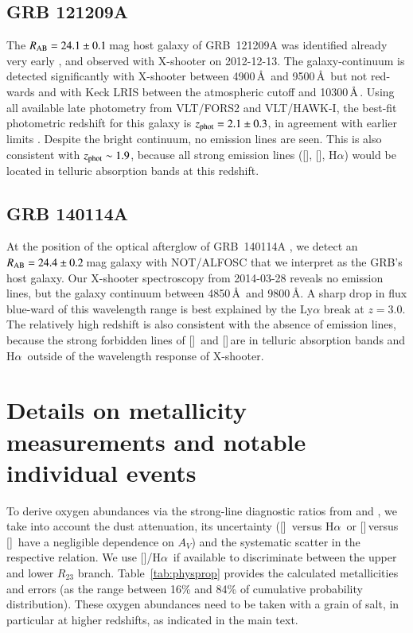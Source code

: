 \documentclass[traditabstract, longauth]{aa}
\newcommand{\ha}{H$\alpha$}
\newcommand{\oii}{[\ion{O}{ii}]}
\newcommand{\oiii}{[\ion{O}{iii}]}
\newcommand{\neiii}{[\ion{Ne}{iii}]}
\newcommand{\nii}{[\ion{N}{ii}]}
\begin{document}
\begin{appendix}
\subsection{GRB 121209A}

The $R_{\rm{AB}}=24.1\pm0.1$\,mag host galaxy of GRB~121209A \citep{2012GCN..14045...1M} was identified already very early \citep{2012GCN..14049...1K, 2012GCN..14056...1P}, and observed with X-shooter on 2012-12-13. The galaxy-continuum is detected significantly with X-shooter between 4900\,\AA\, and 9500\,\AA\, but not red-wards and with Keck LRIS between the atmospheric cutoff and 10300\,\AA\,\citep{2012GCN..14056...1P}. Using all available late photometry from VLT/FORS2 and VLT/HAWK-I, the best-fit photometric redshift for this galaxy is $z_{\rm{phot}} = 2.1\pm0.3$, in agreement with earlier limits \citep{2012GCN..14056...1P}. Despite the bright continuum, no emission lines are seen. This is also consistent with $z_{\rm{phot}}\sim1.9$, because all strong emission lines (\oiii, \oii, \ha) would be located in telluric absorption bands at this redshift. 

\subsection{GRB 140114A}

At the position of the optical afterglow \citep{2014GCN..15732...1B, 2014GCN..15743...1C} of GRB~140114A \citep{2014GCN..15728...1T}, we detect an $R_{\rm{AB}}=24.4\pm0.2\,$mag galaxy with NOT/ALFOSC that we interpret as the GRB's host galaxy. Our X-shooter spectroscopy from 2014-03-28 reveals no emission lines, but the galaxy continuum between 4850\,\AA\, and 9800\,\AA. A sharp drop in flux blue-ward of this wavelength range is best explained by the Ly$\alpha$ break at $z=3.0$. The relatively high redshift is also consistent with the absence of emission lines, because the strong forbidden lines of \oii\, and \oiii\,are in telluric absorption bands and \ha\, outside of the wavelength response of X-shooter.

\section{Details on metallicity measurements and notable individual events}
\label{sec:metmeas}

To derive oxygen abundances via the strong-line diagnostic ratios from \citet{2006A&A...459...85N} and \citet{2008A&A...488..463M}, we take into account the dust attenuation, its uncertainty (\nii\, versus \ha\, or \neiii\,versus \oii\, have a negligible dependence on $A_V$) and the systematic scatter in the respective relation. We use \nii/\ha\, if available to discriminate between the upper and lower $R_{23}$ branch. Table~\ref{tab:physprop} provides the calculated metallicities and errors (as the range between 16\% and 84\% of cumulative probability distribution). These oxygen abundances need to be taken with a grain of salt, in particular at higher redshifts, as indicated in the main text. 


\end{appendix}
\end{document}
